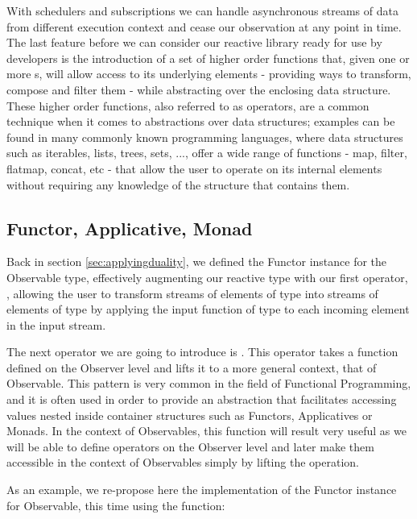 With schedulers and subscriptions we can handle asynchronous streams of data from different execution context and cease our observation at any point in time. The last feature before we can consider our reactive library ready for use by developers is the introduction of a set of higher order functions that, given one or more s, will allow access to its underlying elements - providing ways to transform, compose and filter them - while abstracting over the enclosing data structure. These higher order functions, also referred to as operators, are a common technique when it comes to abstractions over data structures; examples can be found in many commonly known programming languages, where data structures such as iterables, lists, trees, sets, ..., offer a wide range of functions - map, filter, flatmap, concat, etc - that allow the user to operate on its internal elements without requiring any knowledge of the structure that contains them.

\subsection{Functor, Applicative, Monad}

Back in section \ref{sec:applyingduality}, we defined the Functor instance for the Observable type, effectively augmenting our reactive type with our first operator, , allowing the user to transform streams of elements of type  into streams of elements of type  by applying the input function of type  to each incoming element in the input stream.

The next operator we are going to introduce is . This operator takes a function defined on the Observer level and lifts it to a more general context, that of Observable\cite{lift}. This pattern is very common in the field of Functional Programming, and it is often used in order to provide an abstraction that facilitates accessing values nested inside container structures such as Functors, Applicatives or Monads. In the context of Observables, this function will result very useful as we will be able to define operators on the Observer level and later make them accessible in the context of Observables simply by lifting the operation.


As an example, we re-propose here the implementation of the Functor instance for Observable, this time using the  function:

